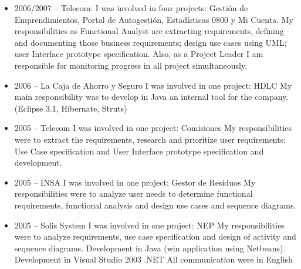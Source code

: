 \documentclass[11pt,a4paper,sans]{moderncv}
\begin{document}
\begin{itemize}
  \item 2006/2007 – Telecom: \newline{}
I was involved in four projects: Gestión de Emprendimientos, Portal de Autogestión, Estadísticas 0800 y Mi Cuenta.
My responsibilities as Functional Analyst are extracting requirements, defining and documenting those business requirements; design use cases using UML;  user Interface prototype specification. Also, as a Project Leader I am responsible for monitoring progress in all project simultaneously.

  \item 2006 –  La Caja de Ahorro y Seguro \newline{}
I was involved in one project: HDLC
My main responsibility was to develop in Java an internal tool for the company. (Eclipse 3.1, Hibernate, Struts)

  \item 2005 – Telecom \newline{}
I was involved in one project: Comisiones
My responsibilities were to extract the requirements, research and prioritize user requirements; Use Case specification and User Interface prototype specification and development.

  \item 2005 – INSA \newline{}
I was involved in one project: Gestor de Residuos
My responsibilities were to analyze user needs to determine functional requirements, functional analysis and design use cases and sequence diagrams.

  \item 2005 – Solis System \newline{}  
I was involved in one project: NEP
My responsibilities were to analyze requirements, use case specification and design of activity and sequence diagrams.
Development in Java (win application using Netbeans).
Development in Visual Studio 2003 .NET
All communication were in English
\newline{}
\end{itemize}




\clearpage
\end{document}

